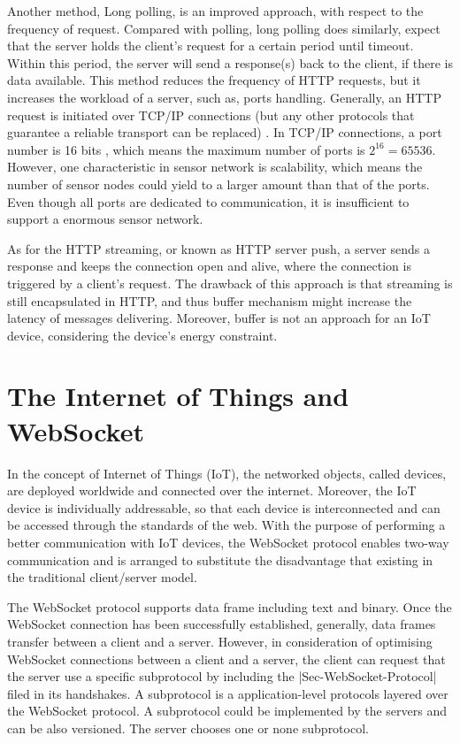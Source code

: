 Another method, Long polling, is an improved approach, with respect to the frequency of request. Compared with polling, long polling does similarly, expect that the server holds the client's request for a certain period until timeout. Within this period, the server will send a response(s) back to the client, if there is data available. This method reduces the frequency of HTTP requests, but it increases the workload of a server, such as, ports handling. Generally, an HTTP request is initiated over TCP/IP connections (but any other protocols that guarantee a reliable transport can be replaced) \cite {fielding1999hypertext}. In TCP/IP connections, a port number is 16 bits \cite{postel2003rfc}, which means the maximum number of ports is \(  2^16  = 65536 \). However, one characteristic in sensor network is scalability, which means the number of sensor nodes could yield to a larger amount than that of the ports. Even though all ports are dedicated to communication, it is insufficient to support a enormous sensor network. 

As for the HTTP streaming, or known as HTTP server push, a server sends a response and keeps the connection open and alive, where the connection is triggered by a client's request. The drawback of this approach is that streaming is still encapsulated in HTTP, and thus buffer mechanism might increase the latency of messages delivering. Moreover, buffer is not an approach for an IoT device, considering the device's energy constraint.

\section{The Internet of Things and WebSocket}

In the concept of Internet of Things (IoT), the networked objects, called devices, are deployed worldwide and connected over the internet. Moreover, the IoT device is individually addressable, so that each device is interconnected and can be accessed through the standards of the web. With the purpose of performing a better communication with IoT devices, the WebSocket protocol enables two-way communication and is arranged to substitute the disadvantage that existing in the traditional client/server model.

The WebSocket protocol supports data frame including text and binary. Once the WebSocket connection has been successfully established, generally, data frames transfer between a client and a server. However, in consideration of optimising WebSocket connections between a client and a server, the client can request that the server use a specific subprotocol by including the |Sec-WebSocket-Protocol| filed in its handshakes\cite{rfc64552012web}. A subprotocol is a application-level protocols layered over the WebSocket protocol\cite{rfc64552012web}. A subprotocol could be implemented by the servers and can be also versioned. The server chooses one or none subprotocol. 


